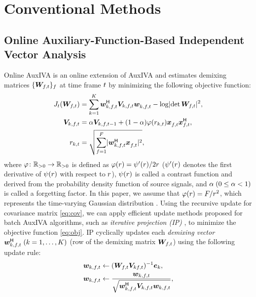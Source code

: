 \documentclass[sip,biber]{now-journal}
\begin{document}
\section{Conventional Methods}\label{sec:conventional}

\subsection{Online Auxiliary-Function-Based Independent Vector Analysis}\label{subsec:oiva}

Online AuxIVA \cite{Taniguchi:2014:HSCMA} is an online extension of AuxIVA \cite{Ono:2011:WASPAA} and estimates demixing matrices $\{\Demix _{\ft}\} _{\freq}$ at time frame $t$ by minimizing the following objective function:
\begin{align}
  J _{\tframe}(\Demix _{\ft}) &= \sum _{\src = 1} ^{\Src} \demix _{\src,\ft} ^{\hermite} \cov _{\src,\ft} \demix _{\src,\ft} ^{\nohermite} - \logdet{\Demix _{\ft}} ^2, \label{eq:obj} \\
  \cov _{\src,\ft} &= \forget \cov _{\src,\ft[-1]} + (1 - \forget) \weight(\var _{\src,\tframe}) \Obs _{\ft} ^{\nohermite} \Obs _{\ft} ^{\hermite}, \label{eq:cov} \\
  \var _{\src,\tframe} &= \sqrt{\sum _{\freq=1} ^{\Freq} \lvert \demix ^{\hermite} _{\src,\ft} \Obs ^{\nohermite}_{\ft} \rvert ^2},
\end{align}
where $\varphi\colon \mathbb{R} _{>0} \to \mathbb{R} _{>0}$ is defined as $\varphi(r) = \psi ' (r) / 2 r$ ($\psi '(r)$ denotes the first derivative of $\psi (r)$ with respect to $r$),
$\psi(r)$ is called a contrast function and derived from the probability density function of source signals,
and $\alpha\; (0 \leq \alpha < 1)$ is called a forgetting factor.
In this paper, we assume that $\varphi (r) = F/{r ^2}$, which represents the time-varying Gaussian distribution \cite{Ono:2012:APSIPA}.
Using the recursive update for covariance matrix \eqref{eq:cov}, we can apply efficient update methods proposed for batch AuxIVA algorithms, such as \emph{iterative projection (IP)} \cite{Ono:2011:WASPAA}, to minimize the objective function \eqref{eq:obj}.
IP cyclically updates each \emph{demixing vector} $\demix _{\src,\ft} ^{\hermite}\; (\src = 1, \dots, \Src)$ (row of the demixing matrix $\Demix _{\ft}$) using the following update rule:
\begin{align}
  \demix _{\src,\ft} &\gets (\Demix _{\ft} \cov _{\src\ft}) ^{-1} \eye _{\src} \label{eq:ip:proj}, \\
  \demix _{\src,\ft} &\gets \frac{{\demix _{\src,\ft}}}{{\sqrt{\demix _{\src,\ft} ^{\hermite} \cov _{\src,\ft} \demix _{\src,\ft}}}} \label{eq:ip:norm},
\end{align}
\end{document}
